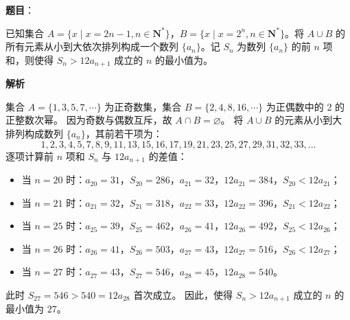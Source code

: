 \begin{answer}

\textbf{题目}：

已知集合 $A = \{x \mid x = 2n - 1, n \in \mathbf{N}^*\}$，$B = \{x \mid x = 2^n, n \in \mathbf{N}^*\}$。将 $A \cup B$ 的所有元素从小到大依次排列构成一个数列 $\{a_n\}$。记 $S_n$ 为数列 $\{a_n\}$ 的前 $n$ 项和，则使得 $S_n > 12a_{n+1}$ 成立的 $n$ 的最小值为\gkblank{}。

\textbf{解析}

集合 $A = \{1, 3, 5, 7, \cdots\}$ 为正奇数集，集合 $B = \{2, 4, 8, 16, \cdots\}$ 为正偶数中的 2 的正整数次幂。
因为奇数与偶数互斥，故 $A \cap B = \varnothing$。
将 $A \cup B$ 的元素从小到大排列构成数列 $\{a_n\}$，其前若干项为：
\nopagebreak[4]
\[1, 2, 3, 4, 5, 7, 8, 9, 11, 13, 15, 16, 17, 19, 21, 23, 25, 27, 29, 31, 32, 33, \dots\]
逐项计算前 $n$ 项和 $S_n$ 与 $12a_{n+1}$ 的差值：
\begin{itemize}
\item 当 $n = 20$ 时：$a_{20} = 31$，$S_{20} = 286$，$a_{21} = 32$，$12a_{21} = 384$，$S_{20} < 12a_{21}$；
\item 当 $n = 21$ 时：$a_{21} = 32$，$S_{21} = 318$，$a_{22} = 33$，$12a_{22} = 396$，$S_{21} < 12a_{22}$；
\item 当 $n = 25$ 时：$a_{25} = 39$，$S_{25} = 462$，$a_{26} = 41$，$12a_{26} = 492$，$S_{25} < 12a_{26}$；
\item 当 $n = 26$ 时：$a_{26} = 41$，$S_{26} = 503$，$a_{27} = 43$，$12a_{27} = 516$，$S_{26} < 12a_{27}$；
\item 当 $n = 27$ 时：$a_{27} = 43$，$S_{27} = 546$，$a_{28} = 45$，$12a_{28} = 540$。
\end{itemize}
此时 $S_{27} = 546 > 540 = 12a_{28}$ 首次成立。
因此，使得 $S_n > 12a_{n+1}$ 成立的 $n$ 的最小值为 $27$。


\end{answer}

